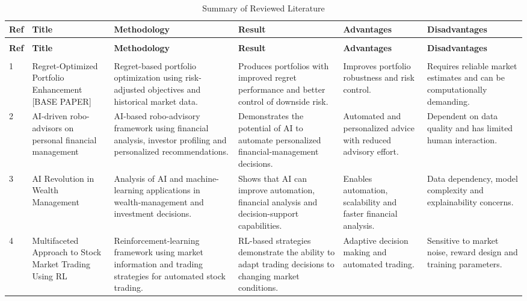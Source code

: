 {\singlespacing\small
\renewcommand{\arraystretch}{1.25}
{\small
\setlength{\tabcolsep}{3pt} %
\begin{longtable}{|>{\centering\arraybackslash}p{}|p{}|p{}|p{}|p{}|p{}|}
\caption{Summary of Reviewed Literature}\label{tab:six_col_litsummary}\\
\hline
\textbf{Ref} & \textbf{Title} & \textbf{Methodology} & \textbf{Result} & \textbf{Advantages} & \textbf{Disadvantages} \\ \hline
\endfirsthead
\multicolumn{6}{c}{\tablename\ \thetable{} -- \emph{continued from previous page}}\\ \hline
\textbf{Ref} & \textbf{Title} & \textbf{Methodology} & \textbf{Result} & \textbf{Advantages} & \textbf{Disadvantages} \\ \hline
\endhead
\hline \multicolumn{6}{r}{\emph{Continued on next page}}\\
\endfoot
\hline
\endlastfoot

1 & Regret-Optimized Portfolio Enhancement [BASE PAPER] & Regret-based portfolio optimization using risk-adjusted objectives and historical market data. & Produces portfolios with improved regret performance and better control of downside risk. & Improves portfolio robustness and risk control. & Requires reliable market estimates and can be computationally demanding. \\ \hline

2 & AI-driven robo-advisors on personal financial management & AI-based robo-advisory framework using financial analysis, investor profiling and personalized recommendations. & Demonstrates the potential of AI to automate personalized financial-management decisions. & Automated and personalized advice with reduced advisory effort. & Dependent on data quality and has limited human interaction. \\ \hline

3 & AI Revolution in Wealth Management & Analysis of AI and machine-learning applications in wealth-management and investment decisions. & Shows that AI can improve automation, financial analysis and decision-support capabilities. & Enables automation, scalability and faster financial analysis. & Data dependency, model complexity and explainability concerns. \\ \hline

4 & Multifaceted Approach to Stock Market Trading Using RL & Reinforcement-learning framework using market information and trading strategies for automated stock trading. & RL-based strategies demonstrate the ability to adapt trading decisions to changing market conditions. & Adaptive decision making and automated trading. & Sensitive to market noise, reward design and training parameters. \\ \hline


\end{longtable}}}
